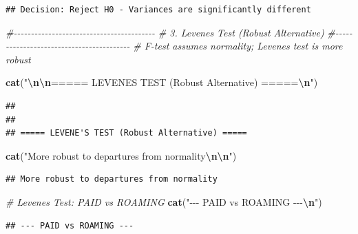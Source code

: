 \documentclass[
  12pt,
]{article}
\newenvironment{Shaded}{\begin{snugshade}}{\end{snugshade}}
\newcommand{\CommentTok}[1]{\textcolor[rgb]{0.56,0.35,0.01}{\textit{#1}}}
\newcommand{\FunctionTok}[1]{\textcolor[rgb]{0.13,0.29,0.53}{\textbf{#1}}}
\newcommand{\NormalTok}[1]{#1}
\newcommand{\SpecialCharTok}[1]{\textcolor[rgb]{0.81,0.36,0.00}{\textbf{#1}}}
\newcommand{\StringTok}[1]{\textcolor[rgb]{0.31,0.60,0.02}{#1}}
\begin{document}
\begin{verbatim}
## Decision: Reject H0 - Variances are significantly different
\end{verbatim}

\begin{Shaded}
\begin{Highlighting}[]
\CommentTok{\#{-}{-}{-}{-}{-}{-}{-}{-}{-}{-}{-}{-}{-}{-}{-}{-}{-}{-}{-}{-}{-}{-}{-}{-}{-}{-}{-}{-}{-}{-}{-}{-}{-}{-}{-}{-}{-}{-}{-}{-}{-}}
\CommentTok{\# 3. Levene\textquotesingle{}s Test (Robust Alternative)}
\CommentTok{\#{-}{-}{-}{-}{-}{-}{-}{-}{-}{-}{-}{-}{-}{-}{-}{-}{-}{-}{-}{-}{-}{-}{-}{-}{-}{-}{-}{-}{-}{-}{-}{-}{-}{-}{-}{-}{-}{-}{-}{-}{-}}
\CommentTok{\# F{-}test assumes normality; Levene\textquotesingle{}s test is more robust}

\FunctionTok{cat}\NormalTok{(}\StringTok{"}\SpecialCharTok{\textbackslash{}n\textbackslash{}n}\StringTok{===== LEVENE\textquotesingle{}S TEST (Robust Alternative) =====}\SpecialCharTok{\textbackslash{}n}\StringTok{"}\NormalTok{)}
\end{Highlighting}
\end{Shaded}

\begin{verbatim}
## 
## 
## ===== LEVENE'S TEST (Robust Alternative) =====
\end{verbatim}

\begin{Shaded}
\begin{Highlighting}[]
\FunctionTok{cat}\NormalTok{(}\StringTok{"More robust to departures from normality}\SpecialCharTok{\textbackslash{}n\textbackslash{}n}\StringTok{"}\NormalTok{)}
\end{Highlighting}
\end{Shaded}

\begin{verbatim}
## More robust to departures from normality
\end{verbatim}

\begin{Shaded}
\begin{Highlighting}[]
\CommentTok{\# Levene\textquotesingle{}s Test: PAID vs ROAMING}
\FunctionTok{cat}\NormalTok{(}\StringTok{"{-}{-}{-} PAID vs ROAMING {-}{-}{-}}\SpecialCharTok{\textbackslash{}n}\StringTok{"}\NormalTok{)}
\end{Highlighting}
\end{Shaded}

\begin{verbatim}
## --- PAID vs ROAMING ---
\end{verbatim}
\end{document}
